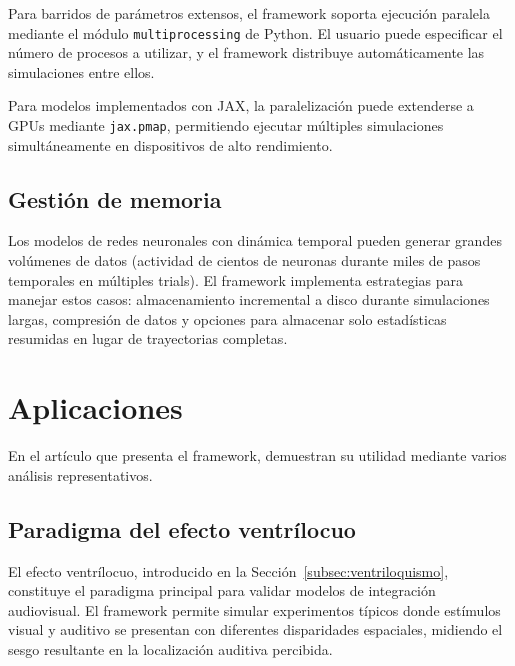 Para barridos de parámetros extensos, el framework soporta ejecución paralela mediante el módulo \texttt{multiprocessing} de Python. El usuario puede especificar el número de procesos a utilizar, y el framework distribuye automáticamente las simulaciones entre ellos.

Para modelos implementados con JAX, la paralelización puede extenderse a GPUs mediante \texttt{jax.pmap}, permitiendo ejecutar múltiples simulaciones simultáneamente en dispositivos de alto rendimiento.

\subsection{Gestión de memoria}
\label{subsec:snmsi_memoria}

Los modelos de redes neuronales con dinámica temporal pueden generar grandes volúmenes de datos (actividad de cientos de neuronas durante miles de pasos temporales en múltiples trials). El framework implementa estrategias para manejar estos casos: almacenamiento incremental a disco durante simulaciones largas, compresión de datos y opciones para almacenar solo estadísticas resumidas en lugar de trayectorias completas.


\section{Aplicaciones}
\label{sec:snmsi_aplicaciones}

En el artículo que presenta el framework, \citet{paredes2025scikit} demuestran su utilidad mediante varios análisis representativos.

\subsection{Paradigma del efecto ventrílocuo}
\label{subsec:snmsi_ventrilocuo}

El efecto ventrílocuo, introducido en la Sección~\ref{subsec:ventriloquismo}, constituye el paradigma principal para validar modelos de integración audiovisual. El framework permite simular experimentos típicos donde estímulos visual y auditivo se presentan con diferentes disparidades espaciales, midiendo el sesgo resultante en la localización auditiva percibida.

